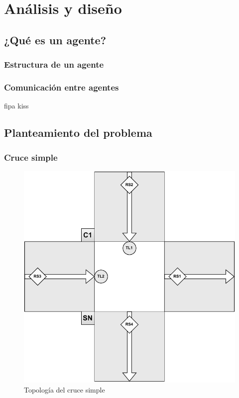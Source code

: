 \chapter{Análisis y diseño}
    \label{chap:four}

\section{¿Qué es un agente?}
\subsection{Estructura de un agente}
\subsection{Comunicación entre agentes}
\Gls{fipa} \acrfull{kiss} 

\cite{texbook}
\cite{atlassian}
\cite{ramon}

\newpage
\section{Planteamiento del problema}

\subsection{Cruce simple}
\begin{figure}[H]
    \centering
    \includegraphics[width=1\linewidth]{text/image/DCruc-CS-Topologia.pdf}
    \caption{Topología del cruce simple}
    \label{fig:cruce_simple_topologia}
\end{figure}

